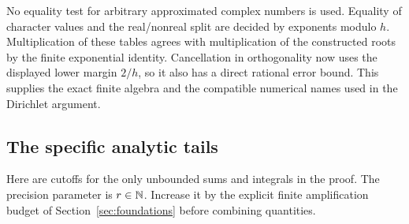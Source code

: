No equality test for arbitrary approximated complex numbers is used. Equality of character values and the real/nonreal split are decided by exponents modulo $h$. Multiplication of these tables agrees with multiplication of the constructed roots by the finite exponential identity. Cancellation in orthogonality now uses the displayed lower margin $2/h$, so it also has a direct rational error bound. This supplies the exact finite algebra and the compatible numerical names used in the Dirichlet argument.

\subsection{The specific analytic tails}

Here are cutoffs for the only unbounded sums and integrals in the proof. The precision parameter is $r\in\mathbb N$. Increase it by the explicit finite amplification budget of Section~\ref{sec:foundations} before combining quantities.

